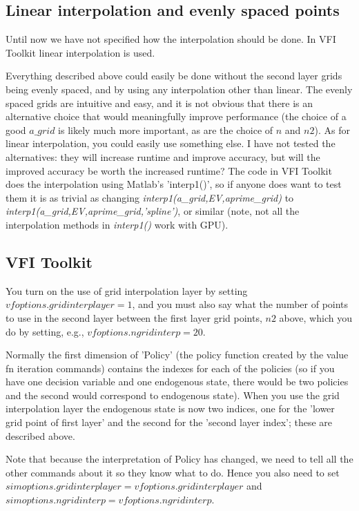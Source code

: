 \documentclass[11pt,fleqn]{article}
\begin{document}
\subsection*{Linear interpolation and evenly spaced points}
Until now we have not specified how the interpolation should be done. In VFI Toolkit linear interpolation is used.

Everything described above could easily be done without the second layer grids being evenly spaced, and by using any interpolation other than linear. The evenly spaced grids are intuitive and easy, and it is not obvious that there is an alternative choice that would meaningfully improve performance (the choice of a good $a\_{}grid$ is likely much more important, as are the choice of $n$ and $n2$). As for linear interpolation, you could easily use something else. I have not tested the alternatives: they will increase runtime and improve accuracy, but will the improved accuracy be worth the increased runtime? The code in VFI Toolkit does the interpolation using Matlab's 'interp1()', so if anyone does want to test them it is as trivial as changing \textit{interp1(a\_{}grid,EV,aprime\_{}grid)} to \textit{interp1(a\_{}grid,EV,aprime\_{}grid,'spline')}, or similar (note, not all the interpolation methods in \textit{interp1()} work with GPU).

\subsection*{VFI Toolkit}
You turn on the use of grid interpolation layer by setting $vfoptions.gridinterplayer=1$, and you must also say what the number of points to use in the second layer between the first layer grid points, $n2$ above, which you do by setting, e.g., $vfoptions.ngridinterp=20$.

Normally the first dimension of 'Policy' (the policy function created by the value fn iteration commands) contains the indexes for each of the policies (so if you have one decision variable and one endogenous state, there would be two policies and the second would correspond to endogenous state). When you use the grid interpolation layer the endogenous state is now two indices, one for the 'lower grid point of first layer' and the second for the 'second layer index'; these are described above.

Note that because the interpretation of Policy has changed, we need to tell all the other commands about it so they know what to do. Hence you also need to set $simoptions.gridinterplayer=vfoptions.gridinterplayer$ and $simoptions.ngridinterp=vfoptions.ngridinterp$.
\end{document}
